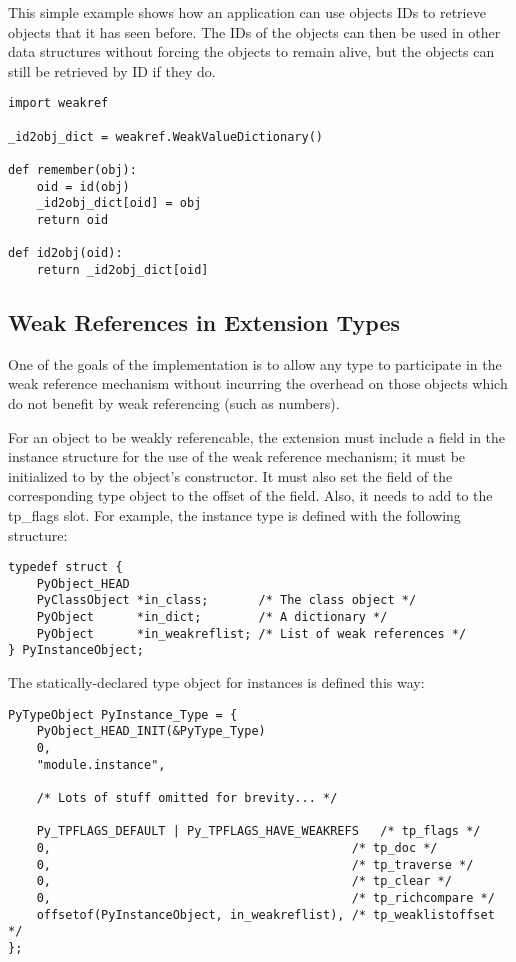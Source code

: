 This simple example shows how an application can use objects IDs to
retrieve objects that it has seen before.  The IDs of the objects can
then be used in other data structures without forcing the objects to
remain alive, but the objects can still be retrieved by ID if they
do.

\begin{verbatim}
import weakref

_id2obj_dict = weakref.WeakValueDictionary()

def remember(obj):
    oid = id(obj)
    _id2obj_dict[oid] = obj
    return oid

def id2obj(oid):
    return _id2obj_dict[oid]
\end{verbatim}


\subsection{Weak References in Extension Types
            \label{weakref-extension}}

One of the goals of the implementation is to allow any type to
participate in the weak reference mechanism without incurring the
overhead on those objects which do not benefit by weak referencing
(such as numbers).

For an object to be weakly referencable, the extension must include a
 field in the instance structure for the use of the
weak reference mechanism; it must be initialized to \NULL{} by the
object's constructor.  It must also set the 
field of the corresponding type object to the offset of the field.
Also, it needs to add  to the
tp_flags slot.  For example, the instance type is defined with the
following structure:

\begin{verbatim}
typedef struct {
    PyObject_HEAD
    PyClassObject *in_class;       /* The class object */
    PyObject      *in_dict;        /* A dictionary */
    PyObject      *in_weakreflist; /* List of weak references */
} PyInstanceObject;
\end{verbatim}

The statically-declared type object for instances is defined this way:

\begin{verbatim}
PyTypeObject PyInstance_Type = {
    PyObject_HEAD_INIT(&PyType_Type)
    0,
    "module.instance",

    /* Lots of stuff omitted for brevity... */

    Py_TPFLAGS_DEFAULT | Py_TPFLAGS_HAVE_WEAKREFS   /* tp_flags */
    0,                                          /* tp_doc */
    0,                                          /* tp_traverse */
    0,                                          /* tp_clear */
    0,                                          /* tp_richcompare */
    offsetof(PyInstanceObject, in_weakreflist), /* tp_weaklistoffset */
};
\end{verbatim}

